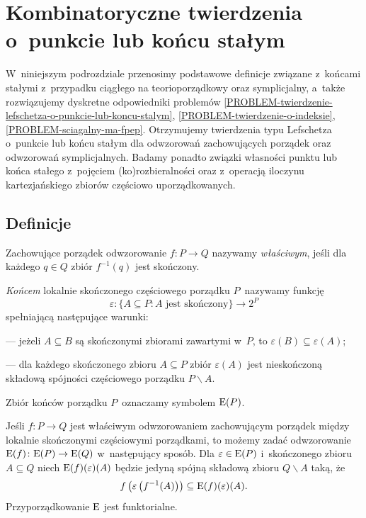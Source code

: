 \section{Kombinatoryczne twierdzenia o~punkcie lub końcu stałym}\label{sec-komb_twi_o_punkcie_stalym}

W~niniejszym podrozdziale przenosimy podstawowe definicje związane z~końcami stałymi z~przypadku ciągłego na teorioporządkowy oraz symplicjalny, a~także rozwiązujemy dyskretne odpowiedniki problemów \ref{PROBLEM-twierdzenie-lefschetza-o-punkcie-lub-koncu-stalym}, \ref{PROBLEM-twierdzenie-o-indeksie}, \ref{PROBLEM-sciagalny-ma-fpep}. Otrzymujemy twierdzenia typu Lefschetza o~punkcie lub końcu stałym dla odwzorowań zachowujących porządek oraz odwzorowań symplicjalnych. Badamy ponadto związki własności punktu lub końca stałego z~pojęciem (ko)rozbieralności oraz z~operacją iloczynu kartezjańskiego zbiorów częściowo uporządkowanych.

\subsection{Definicje}
Zachowujące porządek odwzorowanie  $f\colon P\to Q$ nazywamy \textit{właściwym}, jeśli dla każdego $q\in Q$ zbiór $f^{-1}(q)$ jest skończony.

\textit{Końcem} lokalnie skończonego częściowego porządku $P$~nazywamy funkcję \[\varepsilon\colon \{A\subseteq P:A\text{ jest skończony}\}\to 2^P\] spełniającą następujące warunki:
\begin{compactitem}
\item[---] jeżeli $A\subseteq B$ są skończonymi zbiorami zawartymi w~$P$, to $\varepsilon(B)\subseteq \varepsilon(A)$;
\item[---] dla każdego skończonego zbioru $A\subseteq P$ zbiór $\varepsilon(A)$ jest nieskończoną składową spójności częściowego porządku $P\smallsetminus A$.
\end{compactitem}
Zbiór końców porządku $P$~oznaczamy symbolem $\mathrm{E}(P)$.

Jeśli $f\colon P\to Q$ jest właściwym odwzorowaniem zachowującym porządek między lokalnie skończonymi częściowymi porządkami, to możemy zadać odwzorowanie $\mathrm{E}(f)\colon \mathrm{E}(P)\to \mathrm{E}(Q)$ w~następujący sposób. Dla $\varepsilon\in \mathrm{E}(P)$ i~skończonego zbioru $A\subseteq Q$ niech $\mathrm{E}(f)(\varepsilon)(A)$ będzie jedyną spójną składową zbioru $Q\smallsetminus A$ taką, że \[f\left(\varepsilon\left(f^{-1}(A)\right)\right)\subseteq \mathrm{E}(f)(\varepsilon)(A).\] Przyporządkowanie $\mathrm{E}$ jest funktorialne.

